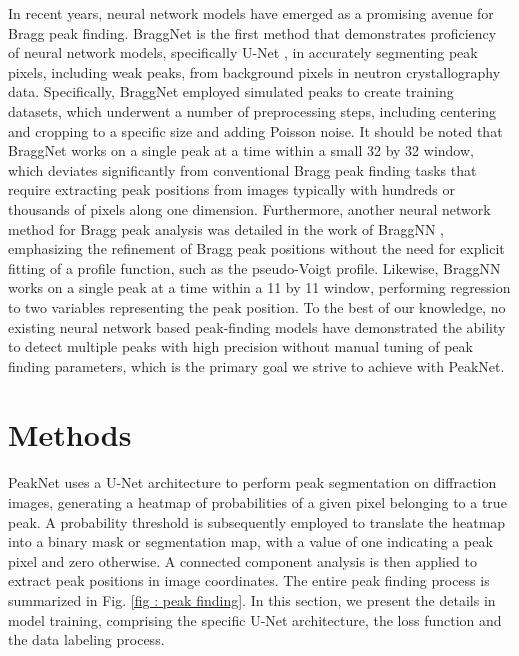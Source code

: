 \documentclass[conference]{IEEEtran}
\newcommand{\peaknet}{PeakNet}
\begin{document}
In recent years, neural network models have emerged as a promising avenue for
Bragg peak finding.  BraggNet \citep{sullivanBraggNetIntegratingBragg2019} is
the first method that demonstrates proficiency of neural network models,
specifically U-Net \citep{ronnebergerUNetConvolutionalNetworks2015}, in
accurately segmenting peak pixels, including weak peaks, from background pixels
in neutron crystallography data.  Specifically, BraggNet employed simulated
peaks to create training datasets, which underwent a number of preprocessing
steps, including centering and cropping to a specific size and adding Poisson
noise.  It should be noted that BraggNet works on a single peak at a time within
a small 32 by 32 window, which deviates significantly from conventional Bragg
peak finding tasks that require extracting peak positions from images typically
with hundreds or thousands of pixels along one dimension.  Furthermore, another
neural network method for Bragg peak analysis was detailed in the work of
BraggNN \citep{liuBraggNNFastXray2021}, emphasizing the refinement of Bragg peak
positions without the need for explicit fitting of a profile function, such as
the pseudo-Voigt profile.  Likewise, BraggNN works on a single peak at a time
within a 11 by 11 window, performing regression to two variables representing
the peak position.  To the best of our knowledge, no existing neural network
based peak-finding models have demonstrated the ability to detect multiple peaks
with high precision without manual tuning of peak finding parameters, which is
the primary goal we strive to achieve with \peaknet{}.



\section{Methods}


\peaknet{} uses a U-Net architecture to perform peak segmentation on diffraction
images, generating a heatmap of probabilities of a given pixel belonging to a
true peak.  A probability threshold is subsequently employed to translate the
heatmap into a binary mask or segmentation map, with a value of one indicating a
peak pixel and zero otherwise.  A connected component analysis
\citep{weaverCentrosymmetricCrossSymmetricMatrices1985} is then applied to
extract peak positions in image coordinates.  The entire peak finding process is
summarized in Fig. \ref{fig : peak finding}.  In this section, we present the
details in model training, comprising the specific U-Net architecture, the loss
function and the data labeling process.
\end{document}
